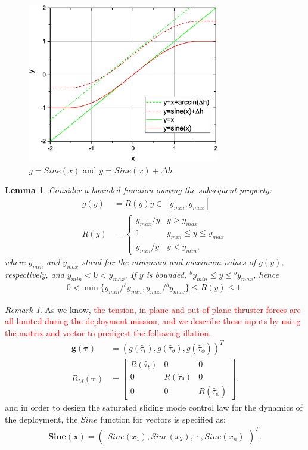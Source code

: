 \documentclass[3p]{elsarticle}
\theoremstyle{plain}
\newtheorem{mylem}{Lemma}
\theoremstyle{remark}
\newtheorem{myrem}{Remark}
\begin{document}
\begin{figure}
\centering
\includegraphics[width=0.75\textwidth]{paper4_fig2.eps}
\caption{$y =Sine(x)$ and $y=Sine(x)+\Delta h$}
\label{fig:2}
\end{figure}
\begin{mylem}\cite{Hu2008552}\label{lemma:2}
Consider a bounded function owning the subsequent property:
\begin{align}
g(y) &= R(y)y\in[y_{min},y_{max}]\\
R(y)&=\begin{cases}
y_{max}/y&y>y_{max}\\
1&y_{min}\le y\le y_{max}\\
y_{min}/y&y<y_{min},
\end{cases}
\end{align}
where $y_{min}$ and $y_{max}$ stand for the minimum and maximum values of $g(y)$, respectively, and $y_{min}<0<y_{max}$. If $y$ is bounded, $^by_{min}\le y\le{^by_{max}}$, hence
\begin{align}
0<\min\{y_{min}/{^by_{min}},y_{max}/{^by_{max}}\}\le R(y)\le 1.
\end{align}
\end{mylem}
\begin{myrem}
As we know, \textcolor{red}{the tension, in-plane and out-of-plane thruster forces are all limited during the deployment mission, and we describe these inputs by using the matrix and vector to predigest the following illation.}
\begin{align}
\bm{g}(\bm\tau) &= \left(g(\hat\tau_t),g(\hat\tau_\theta),g(\hat\tau_\phi)\right)^T\\
R_M(\bm\tau) &= \begin{bmatrix}R(\hat\tau_t)&0&0\\0&R(\hat\tau_\theta)&0\\0&0&R(\hat\tau_\phi)\end{bmatrix}.
\end{align}
and in order to design the saturated sliding mode control law for the dynamics of the deployment, the $Sine$ function for vectors is specified as:
\begin{align}
\bm{Sine}(\bm x)=\begin{pmatrix}Sine(x_1),Sine(x_2),\cdots,Sine(x_n)\end{pmatrix}^T.
\end{align}
\end{myrem}
\end{document}
